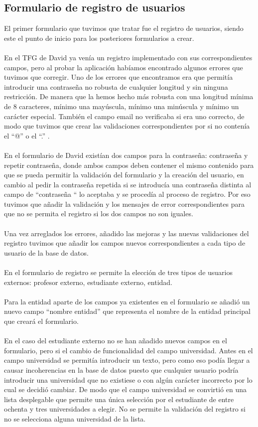 \documentclass[11pt]{article}
\begin{document}
\subsection{Formulario de registro de usuarios}
El primer formulario que tuvimos que tratar fue el registro de usuarios, siendo este el punto de inicio para los posteriores formularios a crear.\\\\
En el TFG de David ya venía un registro implementado con sus correspondientes campos, pero al probar la aplicación habíamos encontrado algunos errores que tuvimos que corregir. Uno de los errores que encontramos era que permitía introducir una contraseña no robusta de cualquier longitud y sin ninguna restricción. De manera que la hemos hecho más robusta con una longitud mínima de 8 caracteres, mínimo una mayúscula, mínimo una minúscula y mínimo un carácter especial. También el campo email no verificaba si era uno  correcto, de modo que tuvimos que crear las validaciones correspondientes por si no contenía el “@” o el “.” .\\\\
En el formulario de David existían dos campos para la contraseña: contraseña y repetir contraseña, donde ambos campos deben contener el mismo contenido para que se pueda permitir la validación del formulario y la creación del usuario, en cambio al pedir la contraseña repetida si se introducía una contraseña distinta al campo de “contraseña “ lo aceptaba y se procedía al proceso de registro. Por eso tuvimos que añadir la validación y los mensajes de error correspondientes para que no se permita el registro si los dos campos no son iguales.\\\\
Una vez arreglados los errores, añadido las mejoras y las nuevas validaciones del registro tuvimos que añadir los campos nuevos correspondientes a cada tipo de usuario de la base de datos. \\\\
En el formulario de registro se permite la elección de tres tipos de usuarios externos: profesor externo, estudiante externo, entidad.\\\\
Para la entidad aparte de los campos ya existentes en el formulario se añadió un nuevo campo “nombre entidad” que representa el nombre de la entidad principal que creará el formulario.\\\\
En el caso del estudiante externo no se han añadido nuevos campos en el formulario, pero si el cambio de funcionalidad del campo universidad. Antes en el campo universidad se permitía introducir un texto, pero como eso podía llegar a causar incoherencias en la base de datos puesto que cualquier usuario podría introducir una universidad que no existiese o con algún carácter incorrecto por lo cual se decidió cambiar. De modo que el campo universidad se convirtió en una lista desplegable que permite una única selección por el estudiante de entre ochenta y tres universidades a elegir.  No se permite la validación del registro si no se selecciona alguna universidad de la lista. \\\\
\end{document}
